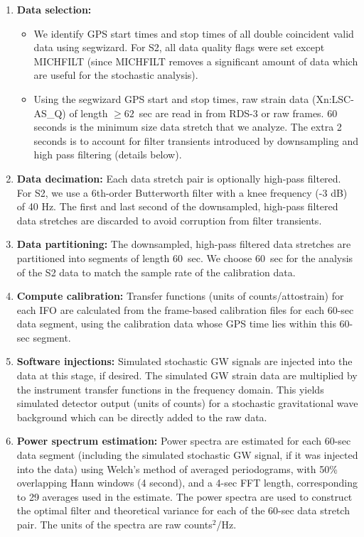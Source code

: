 \begin{enumerate}

\item \textbf{Data selection:}
\begin{itemize}
\item We identify GPS start times and stop times of all double
coincident valid data using segwizard. For S2, all data quality flags
were set except MICHFILT (since MICHFILT removes a significant amount of
data which are useful for the stochastic analysis).
\item Using the segwizard GPS start and stop times, raw strain data
(Xn:LSC-AS\_Q) of length $\ge 62$~sec are read in from RDS-3 or raw
frames. 60 seconds is the minimum size data stretch that we analyze. The
extra 2 seconds is to account for filter transients introduced by
downsampling and high pass filtering (details below).
\end{itemize}

\item \textbf{Data decimation:}
Each data stretch pair is optionally high-pass filtered. For S2, we use
a 6th-order Butterworth filter with a knee frequency (-3 dB) of 40 Hz.
The first and last second of the downsampled, high-pass filtered data
stretches are discarded to avoid corruption from filter transients.

\item \textbf{Data partitioning:}
The downsampled, high-pass filtered data stretches are partitioned into
segments of length 60~sec. We choose 60~sec for the analysis of the S2
data to match the sample rate of the calibration data.

\item \textbf{Compute calibration:}
Transfer functions (units of counts/attostrain) for each IFO are
calculated from the frame-based calibration files for each 60-sec data
segment, using the calibration data whose GPS time lies within this
60-sec segment.

\item \textbf{Software injections:}
Simulated stochastic GW signals are injected into the data at this
stage, if desired. The simulated GW strain data are multiplied by the
instrument transfer functions in the frequency domain. This yields
simulated detector output (units of counts) for a stochastic
gravitational wave background which can be directly added to the raw
data.

\item \textbf{Power spectrum estimation:} 
Power spectra are estimated for each 60-sec data segment (including the
simulated stochastic GW signal, if it was injected into the data) using
Welch's method of averaged periodograms, with 50\% overlapping Hann
windows (4 second), and a 4-sec FFT length, corresponding to 29 averages
used in the estimate. The power spectra are used to construct the
optimal filter and theoretical variance for each of the 60-sec data
stretch pair. The units of the spectra are raw counts$^2$/Hz.


\end{enumerate}
